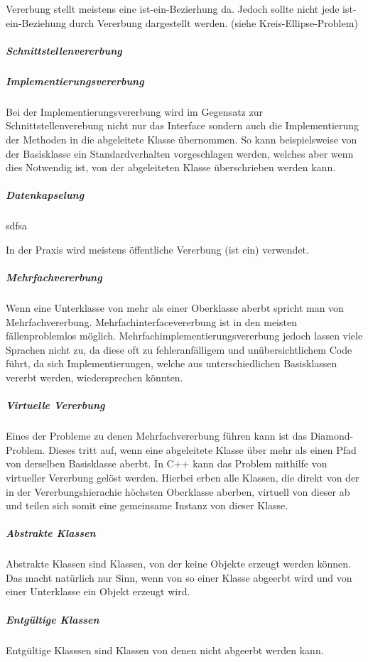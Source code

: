 				Vererbung stellt meistens eine ist-ein-Bezierhung da. 
				Jedoch sollte nicht jede ist-ein-Beziehung durch Vererbung dargestellt werden. (siehe Kreis-Ellipse-Problem)
				
				\subparagraph{Schnittstellenvererbung}
				
				\subparagraph{Implementierungsvererbung}
					Bei der Implementierungsvererbung wird im Gegensatz zur Schnittstellenverebung nicht nur das Interface
					sondern auch die Implementierung der Methoden in die abgeleitete Klasse übernommen. So kann
					beispielsweise von der Basisklasse ein Standardverhalten vorgeschlagen werden, welches aber wenn dies
					Notwendig ist, von der abgeleiteten Klasse überschrieben werden kann.
				
				\subparagraph{Datenkapselung}
				sdfsa
					
					
					
					
					In der Praxis wird meistens öffentliche Vererbung (ist ein) verwendet.
				
				\subparagraph{Mehrfachvererbung}
					Wenn eine Unterklasse von mehr als einer Oberklasse aberbt spricht man von Mehrfachvererbung.
					Mehrfachinterfacevererbung ist in den meisten fällenproblemlos möglich. Mehrfachimplementierungsvererbung
					jedoch lassen viele Sprachen nicht zu, da diese oft zu fehleranfälligem und unübersichtlichem Code führt,
					da sich Implementierungen, welche aus unterschiedlichen Basisklassen vererbt werden, wiedersprechen
					könnten.
					
					\subparagraph{Virtuelle Vererbung}
						Eines der Probleme zu denen Mehrfachvererbung führen kann ist das Diamond-Problem. Dieses tritt auf,
						wenn eine abgeleitete Klasse über mehr als einen Pfad von derselben Basisklasse aberbt. In C++ kann
						das Problem mithilfe von virtueller Vererbung gelöst werden. Hierbei erben alle Klassen, die direkt
						von der in der Vererbungshierachie höchsten Oberklasse aberben, virtuell von dieser ab und teilen sich
						somit eine gemeinsame Instanz von dieser Klasse.
				
				\subparagraph{Abstrakte Klassen}
					Abstrakte Klassen sind Klassen, von der keine Objekte erzeugt werden können. Das macht natürlich nur Sinn,
					wenn von so einer Klasse abgeerbt wird und von einer Unterklasse ein Objekt erzeugt wird.
				
				\subparagraph{Entgültige Klassen}
					Entgültige Klasssen sind Klassen von denen nicht abgeerbt werden kann.
					
